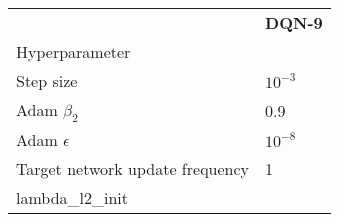 \begin{tabular}{ll}
 & \bfseries DQN-9 \\
Hyperparameter &  \\
Step size & $10^{-3}$ \\
Adam $\beta_2$ & 0.9 \\
Adam $\epsilon$ & $10^{-8}$ \\
Target network update frequency & 1 \\
lambda_l2_init &  \\
\end{tabular}
